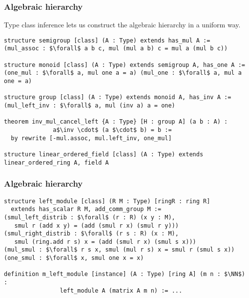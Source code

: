 \documentclass{beamer}
\newcommand{\NN}{\mathbb{N}}
\newcommand{\inv}{^{-1}}
\begin{document}
\begin{frame}[fragile]
\frametitle{Algebraic hierarchy}
Type class inference lets us construct the algebraic hierarchy in a uniform way.
\begin{lstlisting}[basicstyle=\footnotesize]
structure semigroup [class] (A : Type) extends has_mul A :=
(mul_assoc : $\forall$ a b c, mul (mul a b) c = mul a (mul b c))

structure monoid [class] (A : Type) extends semigroup A, has_one A :=
(one_mul : $\forall$ a, mul one a = a) (mul_one : $\forall$ a, mul a one = a)

structure group [class] (A : Type) extends monoid A, has_inv A :=
(mul_left_inv : $\forall$ a, mul (inv a) a = one)

theorem inv_mul_cancel_left {A : Type} [H : group A] (a b : A) : 
              a$\inv \cdot$ (a $\cdot$ b) = b :=
  by rewrite [-mul.assoc, mul.left_inv, one_mul]
  
structure linear_ordered_field [class] (A : Type) extends linear_ordered_ring A, field A
\end{lstlisting}

\end{frame}


\begin{frame}[fragile]
\frametitle{Algebraic hierarchy}
\begin{lstlisting}[basicstyle=\footnotesize]
structure left_module [class] (R M : Type) [ringR : ring R]
  extends has_scalar R M, add_comm_group M :=
(smul_left_distrib : $\forall$ (r : R) (x y : M), 
   smul r (add x y) = (add (smul r x) (smul r y)))
(smul_right_distrib : $\forall$ (r s : R) (x : M), 
   smul (ring.add r s) x = (add (smul r x) (smul s x)))
(mul_smul : $\forall$ r s x, smul (mul r s) x = smul r (smul s x))
(one_smul : $\forall$ x, smul one x = x)

definition m_left_module [instance] (A : Type) [ring A] (m n : $\NN$) : 
                left_module A (matrix A m n) := ...
\end{lstlisting}
\end{frame}
\end{document}
